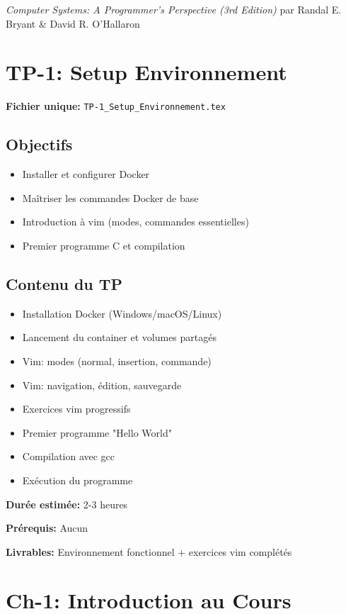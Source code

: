 \documentclass[10pt,a4paper]{article}
\begin{document}
\textit{Computer Systems: A Programmer's Perspective (3rd Edition)} par Randal E. Bryant \& David R. O'Hallaron

\newpage

\section{TP-1: Setup Environnement}

\textbf{Fichier unique:} \texttt{TP-1\_Setup\_Environnement.tex}

\subsection*{Objectifs}
\begin{itemize}
\item Installer et configurer Docker
\item Maîtriser les commandes Docker de base
\item Introduction à vim (modes, commandes essentielles)
\item Premier programme C et compilation
\end{itemize}

\subsection*{Contenu du TP}
\begin{itemize}
\item Installation Docker (Windows/macOS/Linux)
\item Lancement du container et volumes partagés
\item Vim: modes (normal, insertion, commande)
\item Vim: navigation, édition, sauvegarde
\item Exercices vim progressifs
\item Premier programme "Hello World"
\item Compilation avec gcc
\item Exécution du programme
\end{itemize}

\textbf{Durée estimée:} 2-3 heures

\textbf{Prérequis:} Aucun

\textbf{Livrables:} Environnement fonctionnel + exercices vim complétés

\newpage

\section{Ch-1: Introduction au Cours}
\end{document}
